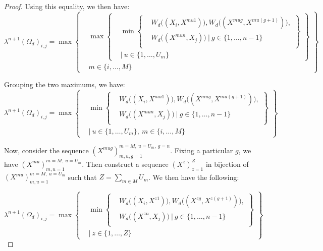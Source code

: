 \documentclass{article} %
\begin{document}
\begin{proof}
Using this equality, we then have:
\[
\lambda^{n+1}(\Omega_d)_{i,j} =\max
\left\{
  \begin{aligned}
  &\max
          \left\{
          \begin{aligned}
            &\min\left\{
            \begin{aligned}
            &W_d\big((X_i,X^{mu1})\big), W_d\big((X^{mug},X^{mu(g+1)})\big), \\
            &W_d\big((X^{mun},X_j)\big)\ |\ g\in\{1,\ldots,n-1\}\\
            \end{aligned}
            \right\} \\
            &|\ u\in\{1,\ldots,U_m\}
          \end{aligned}
          \right\} \\
  & m\in\{i,\ldots,M\}
  \end{aligned}
\right\}
\]

Grouping the two maximums, we have:
\[
\lambda^{n+1}(\Omega_d)_{i,j} =\max
\left\{
  \begin{aligned}
            &\min\left\{
            \begin{aligned}
            &W_d\big((X_i,X^{mu1})\big), W_d\big((X^{mug},X^{mu(g+1)})\big), \\
            &W_d\big((X^{mun},X_j)\big)\ |\ g\in\{1,\ldots,n-1\}\\
            \end{aligned}
            \right\} \\
            &|\ u\in\{1,\ldots,U_m\},\ m\in\{i,\ldots,M\}
  \end{aligned}
\right\}
\]

Now, consider the sequence $(X^{mug})_{m,u,g=1}^{m=M,\ u=U_m,\ g=n}$. Fixing a particular $g$, we have $(X^{mu})_{m,u=1}^{m=M,\ u=U_m}$. Then construct a sequence $(X^z)_{z=1}^Z$ in bijection of $(X^{mu})_{m,u=1}^{m=M,\ u=U_m}$ such that $Z=\sum_{m\in M}U_m$. We then have the following: 

\[
\lambda^{n+1}(\Omega_d)_{i,j} =\max
\left\{
  \begin{aligned}
            &\min\left\{
            \begin{aligned}
            &W_d\big((X_i,X^{z1})\big), W_d\big((X^{zg},X^{z(g+1)})\big), \\
            &W_d\big((X^{zn},X_j)\big)\ |\ g\in\{1,\ldots,n-1\}\\
            \end{aligned}
            \right\} \\
            &|\ z\in\{1,\ldots,Z\}
  \end{aligned}
\right\}
\]


\end{proof}
\end{document}
